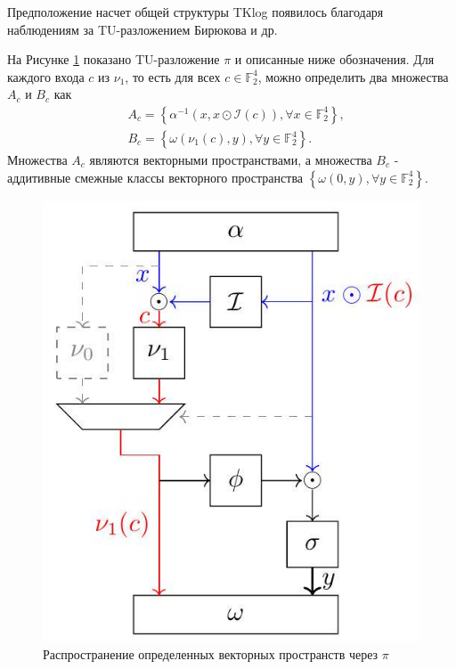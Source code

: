 
Предположение насчет общей структуры TKlog появилось благодаря наблюдениям за TU-разложением Бирюкова и др.

На Рисунке \ref{fig:figC01} показано TU-разложение $\pi$ и описанные ниже обозначения. Для каждого входа $c$ из $\nu_{1}$, то есть для всех $c \in \mathbb{F}_{2}^{4}$, можно определить два множества $A_{c}$ и $B_{c}$ как
$$
\begin{aligned}
& A_{c}=\left\{\alpha^{-1}(x, x \odot \mathcal{I}(c)), \forall x \in \mathbb{F}_{2}^{4}\right\}, \\
& B_{c}=\left\{\omega\left(\nu_{1}(c), y\right), \forall y \in \mathbb{F}_{2}^{4}\right\} .
\end{aligned}
$$
Множества $A_{c}$ являются векторными пространствами, а множества $B_{c}$ - аддитивные смежные классы векторного пространства $\left\{\omega(0, y), \forall y \in \mathbb{F}_{2}^{4}\right\}$.

\begin{figure}
        \centering
        \includegraphics[scale=0.5]{contents/pics/C_pi.jpg}
        \caption{Распространение определенных векторных пространств через \(\pi\)}
        \label{fig:figC01}
\end{figure}

